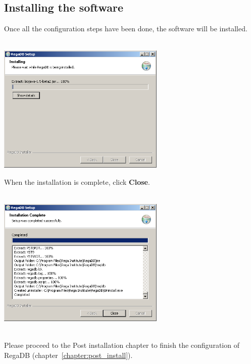 \subsection{Installing the software}
Once all the configuration steps have been done, the software will be installed.
\\
\vspace{0.5cm}~ \\ \centerline{\includegraphics[width=8cm] {pics/nsis/installing_9.png}}
When the installation is complete, click \textbf{Close}. 
\\
\vspace{0.5cm}~ \\ \centerline{\includegraphics[width=8cm] {pics/nsis/installing_10.png}}
\\Please proceed to the Post installation chapter to finish the configuration of RegaDB (chapter~\ref{chapter:post_install}).
